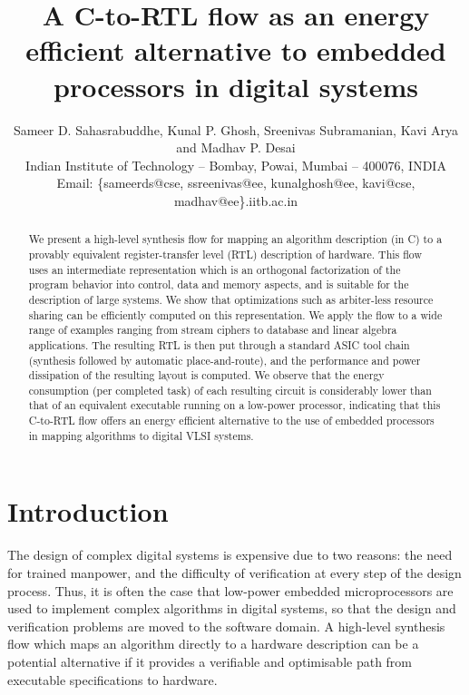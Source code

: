 \documentclass[conference]{IEEEtran}
\title{A C-to-RTL flow as an energy efficient alternative to embedded
  processors in digital systems}
\author{
  Sameer D. Sahasrabuddhe, Kunal P. Ghosh, Sreenivas
  Subramanian, Kavi Arya and Madhav P. Desai\\
  Indian Institute of Technology -- Bombay, Powai, Mumbai -- 400076, INDIA\\
  Email: \{sameerds@cse, ssreenivas@ee, kunalghosh@ee, kavi@cse, madhav@ee\}.iitb.ac.in
}
\begin{document}
\maketitle
\thispagestyle{empty}

\begin{abstract}

  We present a high-level synthesis flow for mapping an algorithm
  description (in C) to a provably equivalent register-transfer level
  (RTL) description of hardware. This flow uses an intermediate
  representation which is an orthogonal factorization of the program
  behavior into control, data and memory aspects, and is suitable for
  the description of large systems. We show that optimizations such as
  arbiter-less resource sharing can be efficiently computed on this
  representation. We apply the flow to a wide range of examples
  ranging from stream ciphers to database and linear algebra
  applications. The resulting RTL is then put through a standard ASIC
  tool chain (synthesis followed by automatic place-and-route), and
  the performance and power dissipation of the resulting layout is
  computed. We observe that the energy consumption (per completed
  task) of each resulting circuit is considerably lower than that of
  an equivalent executable running on a low-power processor,
  indicating that this C-to-RTL flow offers an energy efficient
  alternative to the use of embedded processors in mapping algorithms
  to digital VLSI systems.

\end{abstract}

\section{Introduction}


The design of complex digital systems is expensive due to two reasons:
the need for trained manpower, and the difficulty of verification at
every step of the design process. Thus, it is often the case that
low-power embedded microprocessors are used to implement complex
algorithms in digital systems, so that the design and verification
problems are moved to the software domain. A high-level synthesis flow
which maps an algorithm directly to a hardware description can be a
potential alternative if it provides a verifiable and optimisable path
from executable specifications\cite{gajski-executable-specification}
to hardware.   
\end{document}

